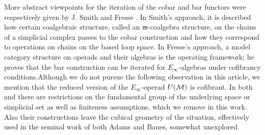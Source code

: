 More abstract viewpoints for the iteration of the cobar and bar functors were respectively given by J. Smith \cite{smith1994cobar} and Fresse \cite{fresse2010props}.
In Smith's approach, it is described how certain coalgebraic structure, called an $\mathfrak{m}$-coalgebra structure, on the chains of a simplicial complex passes to the cobar construction and how they correspond to operations on chains on the based loop space.
In Fresse's approach, a model category structure on operads and their algebras is the operating framework; he proves that the bar construction can be iterated for $E_{\infty}$-algebras under cofibrancy conditions.Although we do not pursue the following observation in this article, we mention that the reduced version of the $E_{\infty}$-operad $U(\mathcal{M})$ is cofibrant.
In both \cite{fresse2010bar} and \cite{smith1994cobar} there are restrictions on the fundamental group of the underlying space or simplicial set as well as finiteness assumptions, which we remove in this work.
Also their constructions leave the cubical geometry of the situation, effectively used in the seminal work of both Adams and Baues, somewhat unexplored.